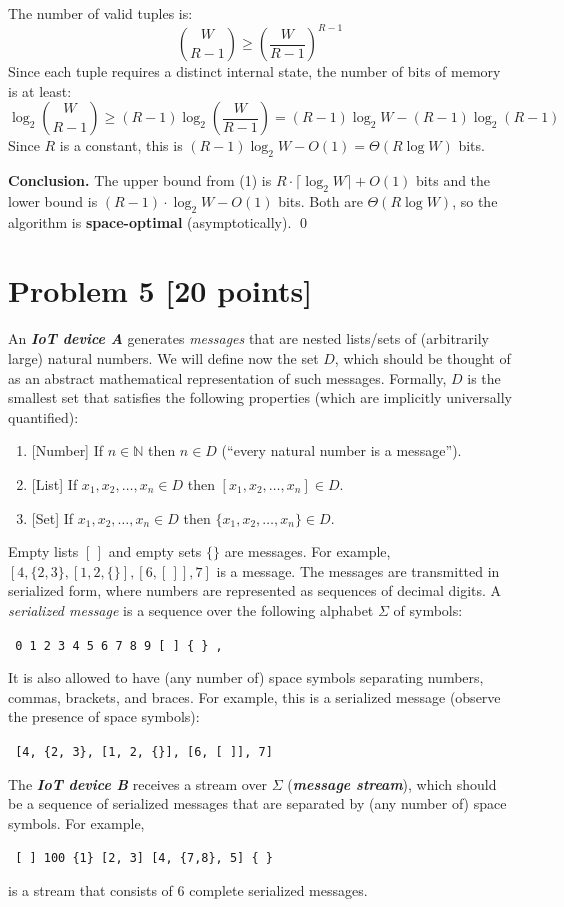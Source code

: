 \documentclass[11pt]{article}
\newcommand{\N}{\mathbb{N}}
\begin{document}
The number of valid tuples is:
\[
  \binom{W}{R-1} \geq \left(\frac{W}{R-1}\right)^{\!R-1}
\]
Since each tuple requires a distinct internal state, the number of bits of memory is at least:
\[
  \log_2 \binom{W}{R-1} \geq (R-1) \log_2 \!\left(\frac{W}{R-1}\right) = (R-1)\log_2 W - (R-1)\log_2(R-1)
\]
Since $R$ is a constant, this is $(R-1) \log_2 W - O(1) = \Theta(R \log W)$ bits.

\textbf{Conclusion.} The upper bound from (1) is $R \cdot \lceil \log_2 W \rceil + O(1)$ bits and the lower bound is $(R-1) \cdot \log_2 W - O(1)$ bits. Both are $\Theta(R \log W)$, so the algorithm is \textbf{space-optimal} (asymptotically). \qed

\newpage
\section*{Problem 5 [20 points]}

An \textbf{\em IoT device A} generates \emph{messages} that are nested lists/sets of (arbitrarily large) natural numbers. We will define now the set $D$, which should be thought of as an abstract mathematical representation of such messages. Formally, $D$ is the smallest set that satisfies the following properties (which are implicitly universally quantified):
\begin{enumerate}
\item{}
[Number] If $n \in \N$ then $n \in D$ (``every natural number is a message'').
\item{}
[List] If $x_1, x_2, \ldots, x_n \in D$ then $[x_1, x_2, \ldots, x_n] \in D$.
\item{}
[Set] If $x_1, x_2, \ldots, x_n \in D$ then $\{ x_1, x_2, \ldots, x_n \} \in D$.
\end{enumerate}
Empty lists $[\,]$ and empty sets $\{ \}$ are messages. For example, $[ 4, \{ 2, 3 \}, [1, 2, \{ \} ], [6, [\,]], 7 ]$ is a message.
%
The messages are transmitted in serialized form, where numbers are represented as sequences of decimal digits. A \emph{serialized message} is a sequence over the following alphabet $\Sigma$ of symbols:
\begin{center}
\tt
0 1 2 3 4 5 6 7 8 9 [ ] \{ \} ,
\end{center}
It is also allowed to have (any number of) space symbols separating numbers, commas, brackets, and braces. For example, this is a serialized message (observe the presence of space symbols):
\begin{center}
\tt
[4, \{2, 3\}, [1, 2, \{\}], [6, [\,]], 7]
\end{center}
The \textbf{\em IoT device B} receives a stream over $\Sigma$ (\textbf{\em message stream}), which should be a sequence of serialized messages that are separated by (any number of) space symbols. For example,
\begin{center}
\tt
[ ] 100 \{1\} [2, 3] [4, \{7,8\}, 5] \{ \}
\end{center}
is a stream that consists of 6 complete serialized messages.
\end{document}
